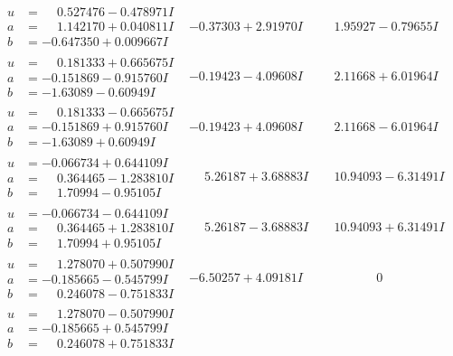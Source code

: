 \documentclass[1p]{elsarticle_modified}
\theoremstyle{definition}
\begin{document}
$$\begin{array}{c|c|c}
\begin{aligned}
u &= \phantom{-}0.527476 - 0.478971 I \\
a &= \phantom{-}1.142170 + 0.040811 I \\
b &= -0.647350 + 0.009667 I\end{aligned}
 & -0.37303 + 2.91970 I & \phantom{-}1.95927 - 0.79655 I \\ \hline\begin{aligned}
u &= \phantom{-}0.181333 + 0.665675 I \\
a &= -0.151869 - 0.915760 I \\
b &= -1.63089 - 0.60949 I\end{aligned}
 & -0.19423 - 4.09608 I & \phantom{-}2.11668 + 6.01964 I \\ \hline\begin{aligned}
u &= \phantom{-}0.181333 - 0.665675 I \\
a &= -0.151869 + 0.915760 I \\
b &= -1.63089 + 0.60949 I\end{aligned}
 & -0.19423 + 4.09608 I & \phantom{-}2.11668 - 6.01964 I \\ \hline\begin{aligned}
u &= -0.066734 + 0.644109 I \\
a &= \phantom{-}0.364465 - 1.283810 I \\
b &= \phantom{-}1.70994 - 0.95105 I\end{aligned}
 & \phantom{-}5.26187 + 3.68883 I & \phantom{-}10.94093 - 6.31491 I \\ \hline\begin{aligned}
u &= -0.066734 - 0.644109 I \\
a &= \phantom{-}0.364465 + 1.283810 I \\
b &= \phantom{-}1.70994 + 0.95105 I\end{aligned}
 & \phantom{-}5.26187 - 3.68883 I & \phantom{-}10.94093 + 6.31491 I \\ \hline\begin{aligned}
u &= \phantom{-}1.278070 + 0.507990 I \\
a &= -0.185665 - 0.545799 I \\
b &= \phantom{-}0.246078 - 0.751833 I\end{aligned}
 & -6.50257 + 4.09181 I & \phantom{-0.000000 } 0 \\ \hline\begin{aligned}
u &= \phantom{-}1.278070 - 0.507990 I \\
a &= -0.185665 + 0.545799 I \\
b &= \phantom{-}0.246078 + 0.751833 I\end{aligned}

\end{array}$$
\end{document}
